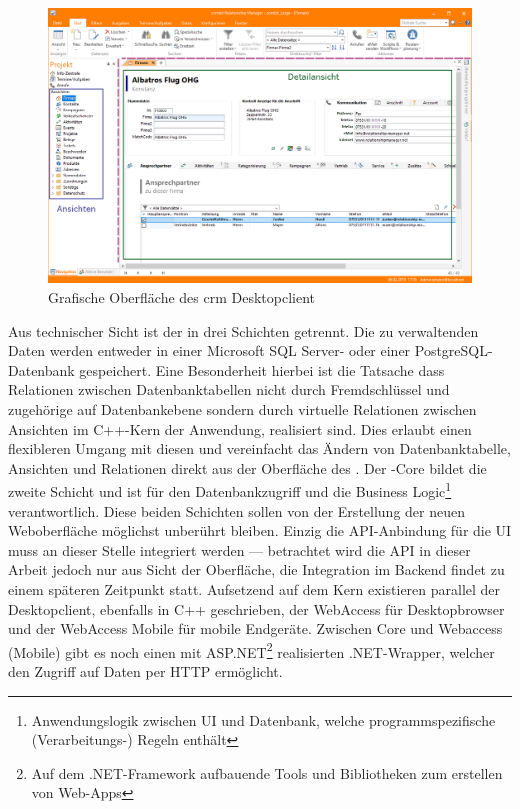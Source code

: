 \begin{figure}
    \centering
    \captionsetup{justification=centering}
    \includegraphics[width=\textwidth]{figures/crm_ui.png}
        \caption{Grafische Oberfläche des \gls{crm} Desktopclient}\label{fig:crm_ui}
\end{figure}

Aus technischer Sicht ist der  in drei Schichten getrennt. Die zu verwaltenden Daten werden entweder in einer Microsoft SQL Server- oder einer PostgreSQL-Datenbank gespeichert. Eine Besonderheit hierbei ist die Tatsache dass Relationen zwischen Datenbanktabellen nicht durch Fremdschlüssel und zugehörige auf Datenbankebene sondern durch virtuelle Relationen zwischen Ansichten im C++-Kern der Anwendung, realisiert sind. Dies erlaubt einen flexibleren Umgang mit diesen und vereinfacht das Ändern von Datenbanktabelle, Ansichten und Relationen direkt aus der Oberfläche des .
Der -Core bildet die zweite Schicht und ist für den Datenbankzugriff und die Business Logic\footnote{Anwendungslogik zwischen UI und Datenbank, welche programmspezifische (Verarbeitungs-) Regeln enthält} verantwortlich. Diese beiden Schichten sollen von der Erstellung der neuen Weboberfläche möglichst unberührt bleiben. Einzig die API-Anbindung für die UI muss an dieser Stelle integriert werden --- betrachtet wird die API in dieser Arbeit jedoch nur aus Sicht der Oberfläche, die Integration im Backend findet zu einem späteren Zeitpunkt statt.
Aufsetzend auf dem Kern existieren parallel der Desktopclient, ebenfalls in C++ geschrieben, der WebAccess für Desktopbrowser und der WebAccess Mobile für mobile Endgeräte. Zwischen Core und Webaccess (Mobile) gibt es noch einen mit ASP.NET\footnote{Auf dem .NET-Framework aufbauende Tools und Bibliotheken zum erstellen von Web-Apps} realisierten .NET-Wrapper, welcher den Zugriff auf Daten per HTTP ermöglicht.


